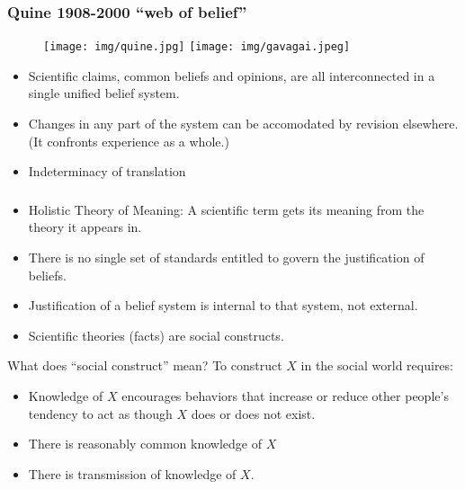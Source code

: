 \documentclass[UTF8,11pt,colorlinks,compress,openany]{beamer}%
\begin{document}
\begin{frame}\frametitle{Quine 1908-2000 ``web of belief''}
\begin{figure}[H]
\texttt{[image: img/quine.jpg]}
\texttt{[image: img/gavagai.jpeg]}
\end{figure}
\begin{itemize}
	\item Scientific claims, common beliefs and opinions, are all interconnected in a single unified belief system.
	\item Changes in any part of the system can be accomodated by revision elsewhere.\\
	(It confronts experience as a whole.)\\
	\item Indeterminacy of translation
\end{itemize}
\end{frame}

\begin{frame}\frametitle{}
\begin{itemize}
	\item Holistic Theory of Meaning: A scientific term gets its meaning from the theory it appears in.
	\item There is no single set of standards entitled to govern the justification of beliefs.
	\item Justification of a belief system is internal to that system, not external.
	\item Scientific theories (facts) are social constructs.
\end{itemize}
\begin{block}{What does ``social construct'' mean?}
To construct $X$ in the social world requires:
\begin{itemize}
	\item Knowledge of $X$ encourages behaviors that increase or reduce other people's tendency to act as though $X$ does or does not exist.
	\item There is reasonably common knowledge of $X$
	\item There is transmission of knowledge of $X$.
\end{itemize}
\end{block}
\end{frame}
\end{document}
